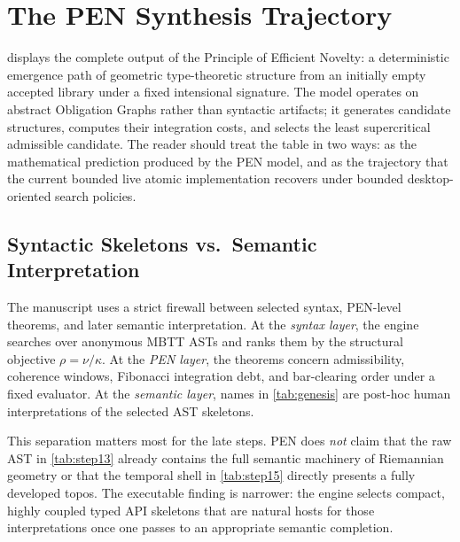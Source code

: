 \documentclass[11pt,a4paper]{article}
\theoremstyle{plain}
\theoremstyle{definition}
\theoremstyle{remark}
\begin{document}
\section{The PEN Synthesis Trajectory}
\label{sec:genesis}

 displays the complete output of the Principle of Efficient Novelty: a deterministic emergence path of geometric type-theoretic structure from an initially empty accepted library under a fixed intensional signature.
The model operates on abstract Obligation Graphs rather than syntactic artifacts; it generates candidate structures, computes their integration costs, and selects the least supercritical admissible candidate.
The reader should treat the table in two ways: as the mathematical prediction produced by the PEN model, and as the trajectory that the current bounded live atomic implementation recovers under bounded desktop-oriented search policies.

\subsection{Syntactic Skeletons vs.\ Semantic Interpretation}
\label{sec:semantic-firewall}

The manuscript uses a strict firewall between selected syntax, PEN-level theorems, and later semantic interpretation.
At the \emph{syntax layer}, the engine searches over anonymous MBTT ASTs and ranks them by the structural objective $\rho = \nu/\kappa$.
At the \emph{PEN layer}, the theorems concern admissibility, coherence windows, Fibonacci integration debt, and bar-clearing order under a fixed evaluator.
At the \emph{semantic layer}, names in \cref{tab:genesis} are post-hoc human interpretations of the selected AST skeletons.

This separation matters most for the late steps.
PEN does \emph{not} claim that the raw AST in \cref{tab:step13} already contains the full semantic machinery of Riemannian geometry or that the temporal shell in \cref{tab:step15} directly presents a fully developed topos.
The executable finding is narrower: the engine selects compact, highly coupled typed API skeletons that are natural hosts for those interpretations once one passes to an appropriate semantic completion.
\end{document}
